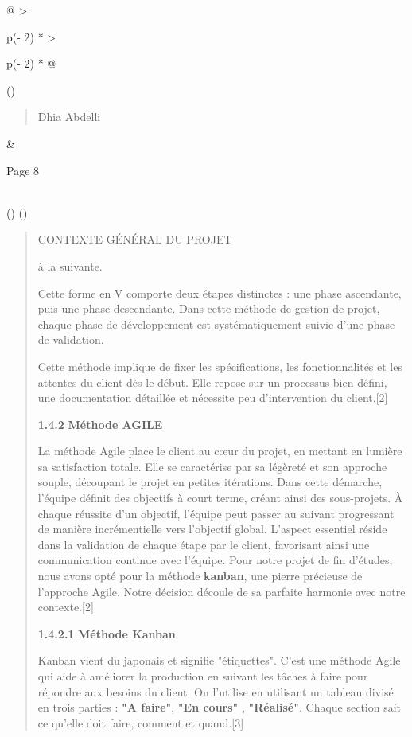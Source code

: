 \documentclass[
]{article}
\begin{document}
\begin{longtable}[]{@{}
  >{\raggedright\arraybackslash}p{(\columnwidth - 2\tabcolsep) * }
  >{\raggedright\arraybackslash}p{(\columnwidth - 2\tabcolsep) * }@{}}
\toprule()
\begin{minipage}[b]{\linewidth}\raggedright
\begin{quote}
Dhia Abdelli
\end{quote}
\end{minipage} & \begin{minipage}[b]{\linewidth}\raggedright
Page 8
\end{minipage} \\
\midrule()
\endhead
\bottomrule()
\end{longtable}

\begin{quote}
CONTEXTE GÉNÉRAL DU PROJET

à la suivante.

Cette forme en V comporte deux étapes distinctes : une phase ascendante,
puis une phase descendante. Dans cette méthode de gestion de projet,
chaque phase de développement est systématiquement suivie d'une phase de
validation.

Cette méthode implique de fixer les spécifications, les fonctionnalités
et les attentes du client dès le début. Elle repose sur un processus
bien défini, une documentation détaillée et nécessite peu d'intervention
du client.{[}2{]}

\textbf{1.4.2} \textbf{Méthode AGILE}

La méthode Agile place le client au cœur du projet, en mettant en
lumière sa satisfaction totale. Elle se caractérise par sa légèreté et
son approche souple, découpant le projet en petites itérations. Dans
cette démarche, l'équipe définit des objectifs à court terme, créant
ainsi des sous-projets. À chaque réussite d'un objectif, l'équipe peut
passer au suivant progressant de manière incrémentielle vers l'objectif
global. L'aspect essentiel réside dans la validation de chaque étape par
le client, favorisant ainsi une communication continue avec l'équipe.
Pour notre projet de fin d'études, nous avons opté pour la méthode
\textbf{kanban}, une pierre précieuse de l'approche Agile. Notre
décision découle de sa parfaite harmonie avec notre contexte.{[}2{]}

\textbf{1.4.2.1} \textbf{Méthode Kanban}

Kanban vient du japonais et signifie "étiquettes". C'est une méthode
Agile qui aide à améliorer la production en suivant les tâches à faire
pour répondre aux besoins du client. On l'utilise en utilisant un
tableau divisé en trois parties : \textbf{"A faire"}, \textbf{"En
cours"} , \textbf{"Réalisé"}. Chaque section sait ce qu'elle doit faire,
comment et quand.{[}3{]}


\end{quote}
\end{document}
